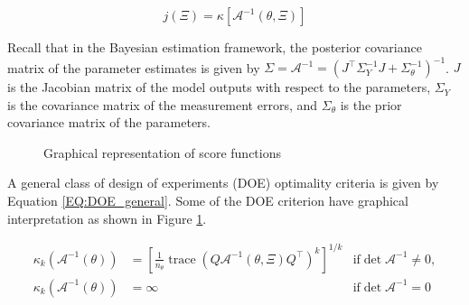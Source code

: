 \documentclass[../Article_Design_of_Experiment.tex]{subfiles}
\begin{document}
	{\footnotesize \begin{equation} j(\Xi) = \kappa\left[ \mathcal{A}^{-1}(\theta, \Xi) \right] \end{equation} }
	
	Recall that in the Bayesian estimation framework, the posterior covariance matrix of the parameter estimates is given by $\Sigma = \mathcal{A}^{-1} = \left(J^\top \Sigma_Y^{-1} J + \Sigma_\theta^{-1}\right)^{-1} $. $J$ is the Jacobian matrix of the model outputs with respect to the parameters, $\Sigma_Y$ is the covariance matrix of the measurement errors, and $\Sigma_\theta$ is the prior covariance matrix of the parameters.
	
	\begin{figure}[!h]
		\centering
		\caption{Graphical representation of score functions}
		\label{fig:score_fun}
	\end{figure}
	
	A general class of design of experiments (DOE) optimality criteria is given by Equation \ref{EQ:DOE_general}. Some of the DOE criterion have graphical interpretation as shown in Figure \ref{fig:score_fun}.
	
	{\footnotesize 
		\begin{align} \label{EQ:DOE_general}
			\kappa_k\left( \mathcal{A}^{-1}(\theta) \right) &= \left[ \frac{1}{n_\theta} \operatorname{trace}\left( Q \mathcal{A}^{-1}(\theta, \Xi) Q^\top \right)^k \right]^{1/k} & \text{if} \det \mathcal{A}^{-1} \neq 0, \nonumber \\ 
			\kappa_k\left( \mathcal{A}^{-1}(\theta) \right) &= \infty & \text{if} \det \mathcal{A}^{-1} = 0
		\end{align} }
	
\end{document}
